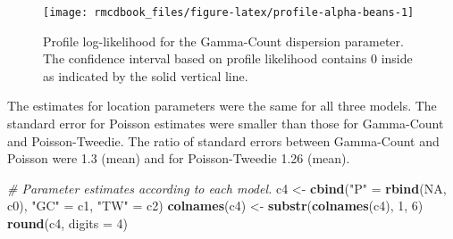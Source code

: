 \documentclass[9pt,a5paper,]{book}
\newenvironment{Shaded}{}{}
\newcommand{\KeywordTok}[1]{\textbf{{#1}}}
\newcommand{\DataTypeTok}[1]{\underline{{#1}}}
\newcommand{\DecValTok}[1]{{#1}}
\newcommand{\StringTok}[1]{{#1}}
\newcommand{\CommentTok}[1]{\textit{{#1}}}
\newcommand{\OtherTok}[1]{{#1}}
\newcommand{\NormalTok}[1]{{#1}}
\renewenvironment{Shaded}{\color{inputcolor}}{}
\renewcommand{\DataTypeTok}[1]{{#1}}
\theoremstyle{definition}
\theoremstyle{definition}
\theoremstyle{remark}
\begin{document}
\begin{figure}[h]

{\centering \texttt{[image: rmcdbook\_files/figure-latex/profile-alpha-beans-1]} 

}

\caption{Profile log-likelihood for the Gamma-Count dispersion parameter. The confidence interval based on profile likelihood contains 0 inside as indicated by the solid vertical line.}\label{fig:profile-alpha-beans}
\end{figure}

The estimates for location parameters were the same for all three
models. The standard error for Poisson estimates were smaller than those
for Gamma-Count and Poisson-Tweedie. The ratio of standard errors
between Gamma-Count and Poisson were 1.3 (mean) and for Poisson-Tweedie
1.26 (mean).

\begin{Shaded}
\end{Shaded}

\begin{Shaded}
\begin{Highlighting}[]
\CommentTok{# Parameter estimates according to each model.}
\NormalTok{c4 <-}\StringTok{ }\KeywordTok{cbind}\NormalTok{(}\StringTok{"P"} \NormalTok{=}\StringTok{ }\KeywordTok{rbind}\NormalTok{(}\OtherTok{NA}\NormalTok{, c0),}
            \StringTok{"GC"} \NormalTok{=}\StringTok{ }\NormalTok{c1,}
            \StringTok{"TW"} \NormalTok{=}\StringTok{ }\NormalTok{c2)}
\KeywordTok{colnames}\NormalTok{(c4) <-}\StringTok{ }\KeywordTok{substr}\NormalTok{(}\KeywordTok{colnames}\NormalTok{(c4), }\DecValTok{1}\NormalTok{, }\DecValTok{6}\NormalTok{)}
\KeywordTok{round}\NormalTok{(c4, }\DataTypeTok{digits =} \DecValTok{4}\NormalTok{)}
\end{Highlighting}
\end{Shaded}
\end{document}
